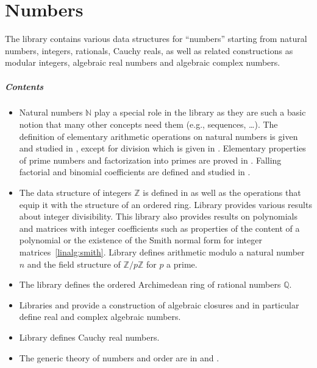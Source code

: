 \chapter{Numbers}

The library contains various data structures for ``numbers''
starting from natural numbers, integers, rationals, Cauchy reals, as well as
related constructions as modular integers, algebraic real numbers and algebraic
complex numbers.

\paragraph{Contents}
\begin{itemize}

\item
Natural numbers $\mathbb{N}$ play a special role in the \mcbMC{} library as they
are such a basic notion that many other concepts need them (e.g., sequences, \ldots).
The definition of elementary arithmetic operations on natural numbers
is given and studied in , except for division
which is given in .  Elementary properties of
prime numbers and factorization into primes are proved in
.  Falling factorial and binomial coefficients are defined
and studied in .

\item
The data structure of integers $\mathbb{Z}$ is defined in 
as well as the operations that equip it with the structure of an
ordered ring. Library  provides various
results about integer divisibility.  This library also provides
results on polynomials and matrices with integer coefficients
such as properties of the content of a polynomial or the
existence of the Smith normal form for integer matrices~\ref{linalg:smith}.
Library  defines arithmetic modulo a natural number $n$
and the field structure of $\mathbb{Z}/p\mathbb{Z}$ for $p$ a prime.

\item
The library  defines the ordered Archimedean ring of
rational numbers $\mathbb{Q}$.

\item
Libraries  and 
provide a construction of algebraic closures and in particular define
real and complex algebraic numbers.

\item
Library  defines Cauchy real numbers.

\item
The generic theory of numbers and order are in 
and .

\end{itemize}

